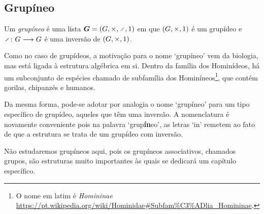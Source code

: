 \subsection{Grupíneo}

\begin{definition}
Um \emph{grupíneo} é uma lista $\bm G = (G,\times,\div,\id)$ em que $(G,\times,1)$ é um grupídeo e $\fun{\div}{G}{G}$ é uma inversão de $(G,\times,1)$.
\end{definition}

Como no caso de grupídeos, a motivação para o nome `grupíneo' vem da biologia, mas está ligada à estrutura algébrica em si. Dentro da família dos Hominídeos, há um subconjunto de espécies chamado de subfamília dos Hominíneos\footnote{O nome em latim é \textit{Homininae} \url{https://pt.wikipedia.org/wiki/Hominidae\#Subfam\%C3\%ADlia_Homininae}.}, que contém gorilas, chipanzés e humanos.

Da mesma forma, pode-se adotar por analogia o nome `grupíneo' para um tipo específico de grupídeo, aqueles que têm uma inversão. A nomenclatura é novamente conveniente pois na palavra `grup\textbf{ín}eo', as letras `in' remetem ao fato de que a estrutura se trata de um grupídeo com inversão.

Não estudaremos grupíneos aqui, pois os grupíneos associativos, chamados grupos, são estruturas muito importantes às quais se dedicará um capítulo específico.

